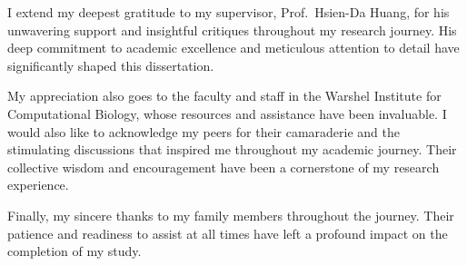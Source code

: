 
I extend my deepest gratitude to my supervisor, Prof.\ Hsien-Da Huang, for his unwavering support and insightful critiques throughout my research journey. His deep commitment to academic excellence and meticulous attention to detail have significantly shaped this dissertation.

My appreciation also goes to the faculty and staff in the Warshel Institute for Computational Biology, whose resources and assistance have been invaluable. I would also like to acknowledge my peers for their camaraderie and the stimulating discussions that inspired me throughout my academic journey. Their collective wisdom and encouragement have been a cornerstone of my research experience.

Finally, my sincere thanks to my family members throughout the journey. Their patience and readiness to assist at all times have left a profound impact on the completion of my study.
